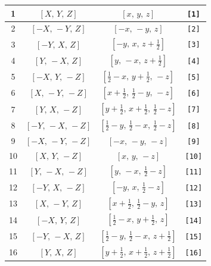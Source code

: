 \documentclass[fleqn,8pt]{jsarticle}
\begin{document}
\begin{longtable}{cccc}
1 & $\left[ X,\, Y,\, Z \right]$ & $\left[ x,\, y,\, z \right]$ & {\tt [1]} \\ \hline
2 & $\left[ - X,\, - Y,\, Z \right]$ & $\left[ - x,\, - y,\, z \right]$ & {\tt [2]} \\ \hline
3 & $\left[ - Y,\, X,\, Z \right]$ & $\left[ - y,\, x,\, z + \frac{1}{2} \right]$ & {\tt [3]} \\ \hline
4 & $\left[ Y,\, - X,\, Z \right]$ & $\left[ y,\, - x,\, z + \frac{1}{2} \right]$ & {\tt [4]} \\ \hline
5 & $\left[ - X,\, Y,\, - Z \right]$ & $\left[ \frac{1}{2} - x,\, y + \frac{1}{2},\, - z \right]$ & {\tt [5]} \\ \hline
6 & $\left[ X,\, - Y,\, - Z \right]$ & $\left[ x + \frac{1}{2},\, \frac{1}{2} - y,\, - z \right]$ & {\tt [6]} \\ \hline
7 & $\left[ Y,\, X,\, - Z \right]$ & $\left[ y + \frac{1}{2},\, x + \frac{1}{2},\, \frac{1}{2} - z \right]$ & {\tt [7]} \\ \hline
8 & $\left[ - Y,\, - X,\, - Z \right]$ & $\left[ \frac{1}{2} - y,\, \frac{1}{2} - x,\, \frac{1}{2} - z \right]$ & {\tt [8]} \\ \hline
9 & $\left[ - X,\, - Y,\, - Z \right]$ & $\left[ - x,\, - y,\, - z \right]$ & {\tt [9]} \\ \hline
10 & $\left[ X,\, Y,\, - Z \right]$ & $\left[ x,\, y,\, - z \right]$ & {\tt [10]} \\ \hline
11 & $\left[ Y,\, - X,\, - Z \right]$ & $\left[ y,\, - x,\, \frac{1}{2} - z \right]$ & {\tt [11]} \\ \hline
12 & $\left[ - Y,\, X,\, - Z \right]$ & $\left[ - y,\, x,\, \frac{1}{2} - z \right]$ & {\tt [12]} \\ \hline
13 & $\left[ X,\, - Y,\, Z \right]$ & $\left[ x + \frac{1}{2},\, \frac{1}{2} - y,\, z \right]$ & {\tt [13]} \\ \hline
14 & $\left[ - X,\, Y,\, Z \right]$ & $\left[ \frac{1}{2} - x,\, y + \frac{1}{2},\, z \right]$ & {\tt [14]} \\ \hline
15 & $\left[ - Y,\, - X,\, Z \right]$ & $\left[ \frac{1}{2} - y,\, \frac{1}{2} - x,\, z + \frac{1}{2} \right]$ & {\tt [15]} \\ \hline
16 & $\left[ Y,\, X,\, Z \right]$ & $\left[ y + \frac{1}{2},\, x + \frac{1}{2},\, z + \frac{1}{2} \right]$ & {\tt [16]} \\
\end{longtable}
\end{document}
